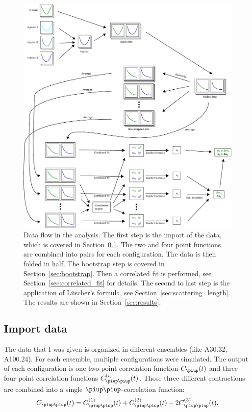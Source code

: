 \documentclass[11pt, english, fleqn, DIV=15, headinclude]{scrartcl}
\begin{document}
\begin{figure}[htbp]
    \centering
    \includegraphics[width=\linewidth]{sketches/Zeichnung.pdf}
    \caption{%
        Data flow in the analysis. The first step is the import of the data,
        which is covered in Section~\ref{sec:import}. The two and four point
        functions are combined into pairs for each configuration. The data is
        then folded in half. The bootstrap step is covered in
        Section~\ref{sec:bootstrap}. Then a correlated fit is performed, see
        Section~\ref{sec:correlated_fit} for details. The second to last step
        is the application of Lüscher's formula, see
        Section~\ref{sec:scattering_length}. The results are shown in
        Section~\ref{sec:results}.
    }
    \label{fig:analysis-flow}
\end{figure}

\subsection{Import data}
\label{sec:import}

The data that I was given is organized in different ensembles (like A30.32,
A100.24). For each ensemble, multiple configurations were simulated. The
output of each configuration is one two-point correlation function $C_\piup(t)$
and three four-point correlation functions $C_{\piup\piup}^{(i)}(t)$. Those
three different contractions are combined into a single
$\piup\piup$-correlation function:
\begin{equation}
    C_{\piup\piup}(t) = C_{\piup\piup}^{(1)}(t) + C_{\piup\piup}^{(2)}(t)
    - 2 C_{\piup\piup}^{(3)}(t).
\end{equation}
\end{document}
